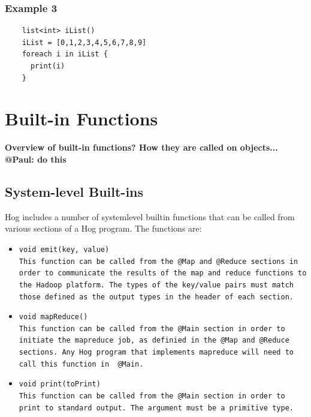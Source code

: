 \documentclass{article}
\begin{document}
\subsubsection{Example 3} %
\label{ssub:example_3}

\begin{verbatim}
    list<int> iList()
    iList = [0,1,2,3,4,5,6,7,8,9]
    foreach i in iList {
      print(i)
    }
\end{verbatim}




\section{Built-in Functions} %
\label{sec:built_in_functions}

\textbf{Overview of built-in functions? How they are called on objects...} \textbf{@Paul: do this}

\subsection{System-level Built-ins} %
\label{sub:system_level_built_ins}

Hog includes a number of system­level built­in functions that can be called from
various sections of a Hog program. The functions are:

\begin{itemize} 

\item[] \tt void emit(key, value) \rm \\

This function can be called from the \tt @Map \rm and \tt @Reduce \rm sections in
order to communicate the results of the map and reduce functions to the Hadoop
platform. The types of the key/value pairs must match those defined as the output
types in the header of each section.

\item[] \tt void mapReduce() \rm \\

This function can be called from the \tt @Main \rm section in order to initiate the
mapreduce job, as definied in the \tt @Map \rm and \tt @Reduce \rm sections. Any
Hog program that implements mapreduce will need to call this function in \tt
@Main\rm.

\item[] \tt void print(toPrint) \rm \\

This function can be called from the \tt @Main \rm section in order to print to
standard output. The argument must be a primitive type.

\end{itemize}
\end{document}
